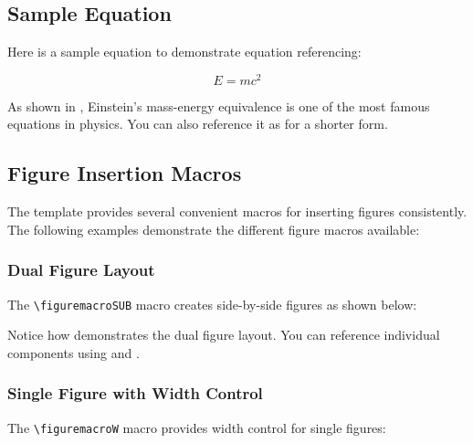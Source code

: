 \subsection{Sample Equation}
Here is a sample equation to demonstrate equation referencing:

\begin{equation}
    E = mc^2
    \label{eqn:sampleequation}
\end{equation}

As shown in , Einstein's mass-energy equivalence is one of the most famous equations in physics. You can also reference it as  for a shorter form.

\subsection{Figure Insertion Macros}
\label{sect:figmacros}

The template provides several convenient macros for inserting figures consistently. The following examples demonstrate the different figure macros available:

\subsubsection{Dual Figure Layout}
The \texttt{\textbackslash figuremacroSUB} macro creates side-by-side figures as shown below:


Notice how  demonstrates the dual figure layout. You can reference individual components using  and .

\subsubsection{Single Figure with Width Control}
The \texttt{\textbackslash figuremacroW} macro provides width control for single figures:


